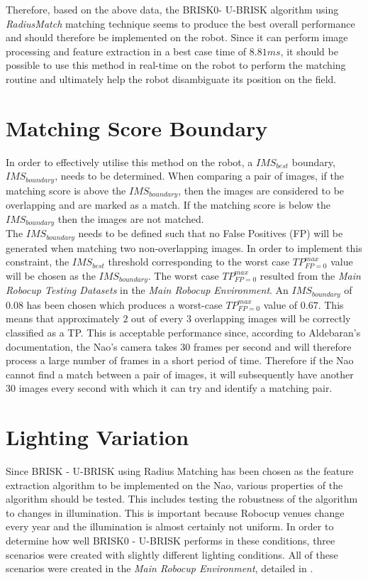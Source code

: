 \documentclass[11pt]{report}
\begin{document}
Therefore, based on the above data, the BRISK0- U-BRISK algorithm using \textit{RadiusMatch} matching technique seems to produce the best overall performance and should therefore be implemented on the robot. Since it can perform image processing and feature extraction in a best case time of $8.81 ms$, it should be possible to use this method in real-time on the robot to perform the matching routine and ultimately help the robot disambiguate its position on the field.\\

\section{Matching Score Boundary}
\label{sec:matchingScoreBoundary}
In order to effectively utilise this method on the robot, a $IMS_{best}$ boundary, $IMS_{boundary}$, needs to be determined. When comparing a pair of images, if the matching score is above the $IMS_{boundary}$, then the images are considered to be overlapping and are marked as a match. If the matching score is below the $IMS_{boundary}$ then the images are not matched. \\

The $IMS_{boundary}$ needs to be defined such that no False Positives (FP) will be generated when matching two non-overlapping images. In order to implement this constraint, the $IMS_{best}$ threshold corresponding to the worst case $TP_{FP=0}^{max}$ value will be chosen as the $IMS_{boundary}$. The worst case $TP_{FP=0}^{max}$ resulted from the \textit{Main Robocup Testing Datasets} in the \textit{Main Robocup Environment}. An $IMS_{boundary}$ of $0.08$ has been chosen which produces a worst-case $TP_{FP=0}^{max}$ value of $0.67$. This means that approximately $2$ out of every $3$ overlapping images will be correctly classified as a TP. This is acceptable performance since, according to Aldebaran's documentation, the Nao's camera takes $30$ frames per second and will therefore process a large number of frames in a short period of time. Therefore if the Nao cannot find a match between a pair of images, it will subsequently have another $30$ images every second with which it can try and identify a matching pair.\\

\section{Lighting Variation}
\label{sec:lighting}
Since BRISK - U-BRISK using Radius Matching has been chosen as the feature extraction algorithm to be implemented on the Nao, various properties of the algorithm should be tested. This includes testing the robustness of the algorithm to changes in illumination. This is important because Robocup venues change every year and the illumination is almost certainly not uniform. In order to determine how well BRISK0 - U-BRISK performs in these conditions, three scenarios were created with slightly different lighting conditions. All of these scenarios were created in the \textit{Main Robocup Environment}, detailed in .\\ 
\end{document}
